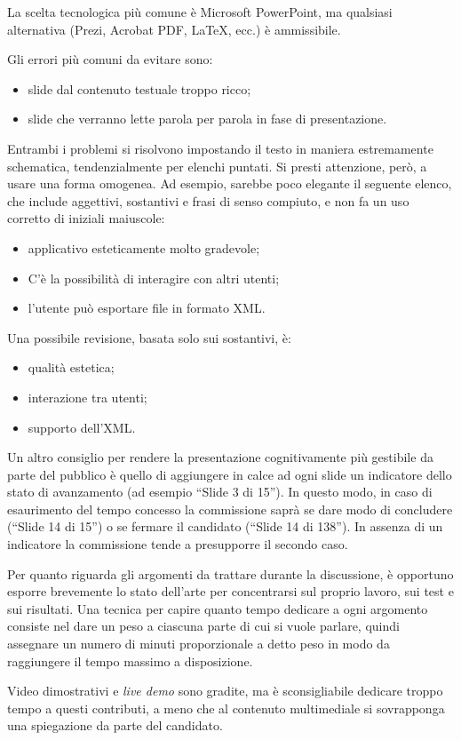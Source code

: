 \documentclass[12pt]{report}
\begin{document}
La scelta tecnologica più comune è Microsoft PowerPoint, ma qualsiasi alternativa (Prezi, Acrobat PDF, \LaTeX, ecc.) è ammissibile. 

Gli errori più comuni da evitare sono:

\begin{itemize}
	\item slide dal contenuto testuale troppo ricco;
	\item slide che verranno lette parola per parola in fase di presentazione.
\end{itemize}

Entrambi i problemi si risolvono impostando il testo in maniera estremamente schematica, tendenzialmente per elenchi puntati. Si presti attenzione, però, a usare una forma omogenea. 
Ad esempio, sarebbe poco elegante il seguente elenco, che include aggettivi, sostantivi e frasi di senso compiuto, e non fa un uso corretto di iniziali maiuscole:

\begin{itemize}
	\item applicativo esteticamente molto gradevole;
	\item C'è la possibilità di interagire con altri utenti;
	\item l'utente può esportare file in formato XML.
\end{itemize}

Una possibile revisione, basata solo sui sostantivi, è: 

\begin{itemize}
	\item qualità estetica;
	\item interazione tra utenti;
	\item supporto dell'XML.
\end{itemize}

Un altro consiglio per rendere la presentazione cognitivamente più gestibile da parte del pubblico è quello di aggiungere in calce ad ogni slide un indicatore dello stato di avanzamento (ad esempio ``Slide 3 di 15''). In questo modo, in caso di esaurimento del tempo concesso la commissione saprà se dare modo di concludere (``Slide 14 di 15'') o se fermare il candidato (``Slide 14 di 138''). In assenza di un indicatore la commissione tende a presupporre il secondo caso.

Per quanto riguarda gli argomenti da trattare durante la discussione, è opportuno esporre brevemente lo stato dell'arte per concentrarsi sul proprio lavoro, sui test e sui risultati. Una tecnica per capire quanto tempo dedicare a ogni argomento consiste nel dare un peso a ciascuna parte di cui si vuole parlare, quindi assegnare un numero di minuti proporzionale a detto peso in modo da raggiungere il tempo massimo a disposizione.

Video dimostrativi e \textit{live demo} sono gradite, ma è sconsigliabile dedicare troppo tempo a questi contributi, a meno che al contenuto multimediale si sovrapponga una spiegazione da parte del candidato.

%
%

\beforebibliography



\closingpage
\end{document}
